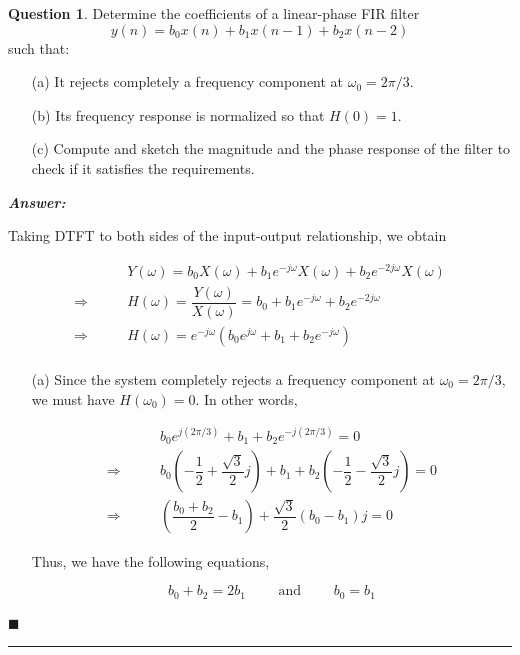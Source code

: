 \documentclass[12pt]{article}
\theoremstyle{definition}
\newtheorem{question}{Question}
\newenvironment{answer}{
    \textbf{\textit{Answer:}} \qquad
}{\hfill $\blacksquare$ \\ \begin{center}
    \rule{0.6\linewidth}{0.5px}    
\end{center}
}
\begin{document}
\begin{question}
    Determine the coefficients of a linear-phase FIR filter
    $$
    y(n) = b_0 x(n) + b_1 x(n-1) + b_2 x(n-2)
    $$
    such that:
    \begin{enumerate}
        \item[(a)] It rejects completely a frequency component at $\omega_0 = 2\pi /3$.
        \item[(b)] Its frequency response is normalized so that $H(0) = 1$.
        \item[(c)] Compute and sketch the magnitude and the phase response of the filter to check if it satisfies the requirements.  
    \end{enumerate}
\end{question}

\begin{answer}
    Taking DTFT to both sides of the input-output relationship, we obtain 

    \begin{align*}
        & Y(\omega) = b_0 X(\omega) + b_1 e^{-j\omega} X(\omega) + b_2 e^{-2j\omega} X(\omega)\\
        \Rightarrow \qquad & H(\omega) = \dfrac{Y(\omega)}{X(\omega)} = b_0 + b_1 e^{-j\omega} + b_2 e^{-2j\omega}\\
        \Rightarrow \qquad & H(\omega) = e^{-j\omega} (b_0e^{j\omega} + b_1 + b_2 e^{-j\omega})\\
    \end{align*}

    \begin{enumerate}
        \item[(a)] Since the system completely rejects a frequency component at $\omega_0 = 2\pi/3$, we must have $H(\omega_0) = 0$. In other words,
        
        \begin{align*}
            & b_0 e^{j(2\pi/3)} + b_1 + b_2 e^{-j(2\pi/3)} = 0\\
            \Rightarrow \qquad & b_0 \left( -\dfrac{1}{2} + \dfrac{\sqrt{3}}{2}j \right) + b_1 + b_2 \left( -\dfrac{1}{2} - \dfrac{\sqrt{3}}{2}j \right) = 0\\
            \Rightarrow \qquad & \left( \dfrac{b_0 + b_2}{2} - b_1 \right) + \dfrac{\sqrt{3}}{2}(b_0 - b_1)j = 0
        \end{align*}

        Thus, we have the following equations,

        \begin{equation}
            b_0 + b_2 = 2b_1 \qquad \text{ and } \qquad b_0 = b_1     
            \label{eqn:eq-1}
        \end{equation}
        

\end{enumerate}
\end{answer}
\end{document}
